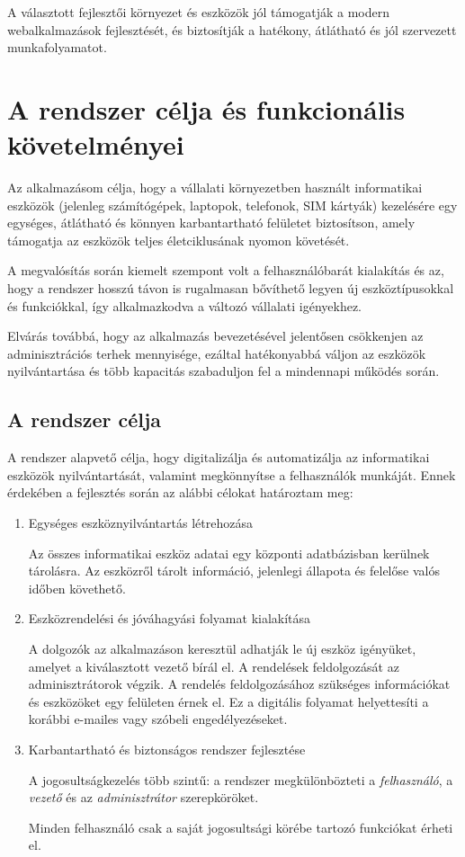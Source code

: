 \documentclass[
]{thesis-ekf}
\theoremstyle{definition}
\theoremstyle{remark}
\begin{document}
A választott fejlesztői környezet és eszközök jól támogatják a modern webalkalmazások fejlesztését, és biztosítják a hatékony, átlátható és jól szervezett munkafolyamatot.

\chapter{A rendszer célja és funkcionális követelményei}

Az alkalmazásom célja, hogy a vállalati környezetben használt informatikai eszközök (jelenleg számítógépek, laptopok, telefonok, SIM kártyák) kezelésére egy egységes, átlátható és könnyen karbantartható felületet biztosítson, amely támogatja az eszközök teljes életciklusának nyomon követését.

A megvalósítás során kiemelt szempont volt a felhasználóbarát kialakítás és az, hogy a rendszer hosszú távon is rugalmasan bővíthető legyen új eszköztípusokkal és funkciókkal, így alkalmazkodva a változó vállalati igényekhez.

Elvárás továbbá, hogy az alkalmazás bevezetésével jelentősen csökkenjen az adminisztrációs terhek mennyisége, ezáltal hatékonyabbá váljon az eszközök nyilvántartása és több kapacitás szabaduljon fel a mindennapi működés során.

\section{A rendszer célja}

A rendszer alapvető célja, hogy digitalizálja és automatizálja az informatikai eszközök nyilvántartását, valamint megkönnyítse a felhasználók munkáját.
Ennek érdekében a fejlesztés során az alábbi célokat határoztam meg:

\begin{enumerate}
	\item Egységes eszköznyilvántartás létrehozása
	
	Az összes informatikai eszköz adatai egy központi adatbázisban kerülnek tárolásra.
	Az eszközről tárolt információ, jelenlegi állapota és felelőse valós időben követhető.
	
	\item Eszközrendelési és jóváhagyási folyamat kialakítása 
	
	A dolgozók az alkalmazáson keresztül adhatják le új eszköz igényüket, amelyet a kiválasztott vezető bírál el.
	A rendelések feldolgozását az adminisztrátorok végzik.
	A rendelés feldolgozásához szükséges információkat és eszközöket egy felületen érnek el.
	Ez a digitális folyamat helyettesíti a korábbi e-mailes vagy szóbeli engedélyezéseket.
	
	\item Karbantartható és biztonságos rendszer fejlesztése
	
	A jogosultságkezelés több szintű: a rendszer megkülönbözteti a \textit{felhasználó}, a \textit{vezető} és az \textit{adminisztrátor} szerepköröket.
	
	Minden felhasználó csak a saját jogosultsági körébe tartozó funkciókat érheti el.
\end{enumerate}
\end{document}
